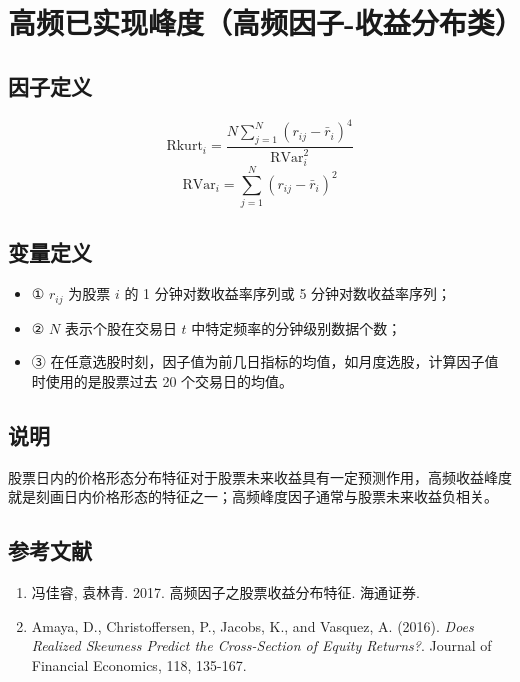 \documentclass{article}
\begin{document}
\section{高频已实现峰度（高频因子-收益分布类）}

\subsection{因子定义}
\begin{equation}
    \mathrm{Rkurt}_i = \frac{N \sum_{j=1}^N (r_{ij} - \bar{r}_i)^4}{\mathrm{RVar}_i^2}
\end{equation}
\begin{equation}
    \mathrm{RVar}_i = \sum_{j=1}^N (r_{ij} - \bar{r}_i)^2
\end{equation}

\subsection{变量定义}
\begin{itemize}
    \item ① \( r_{ij} \) 为股票 \( i \) 的 1 分钟对数收益率序列或 5 分钟对数收益率序列；
    \item ② \( N \) 表示个股在交易日 \( t \) 中特定频率的分钟级别数据个数；
    \item ③ 在任意选股时刻，因子值为前几日指标的均值，如月度选股，计算因子值时使用的是股票过去 20 个交易日的均值。
\end{itemize}

\subsection{说明}
股票日内的价格形态分布特征对于股票未来收益具有一定预测作用，高频收益峰度就是刻画日内价格形态的特征之一；高频峰度因子通常与股票未来收益负相关。

\subsection{参考文献}
\begin{enumerate}
    \item 冯佳睿, 袁林青. 2017. 高频因子之股票收益分布特征. 海通证券.
    \item Amaya, D., Christoffersen, P., Jacobs, K., and Vasquez, A. (2016). \textit{Does Realized Skewness Predict the Cross-Section of Equity Returns?}. Journal of Financial Economics, 118, 135-167.
\end{enumerate}
\end{document}
